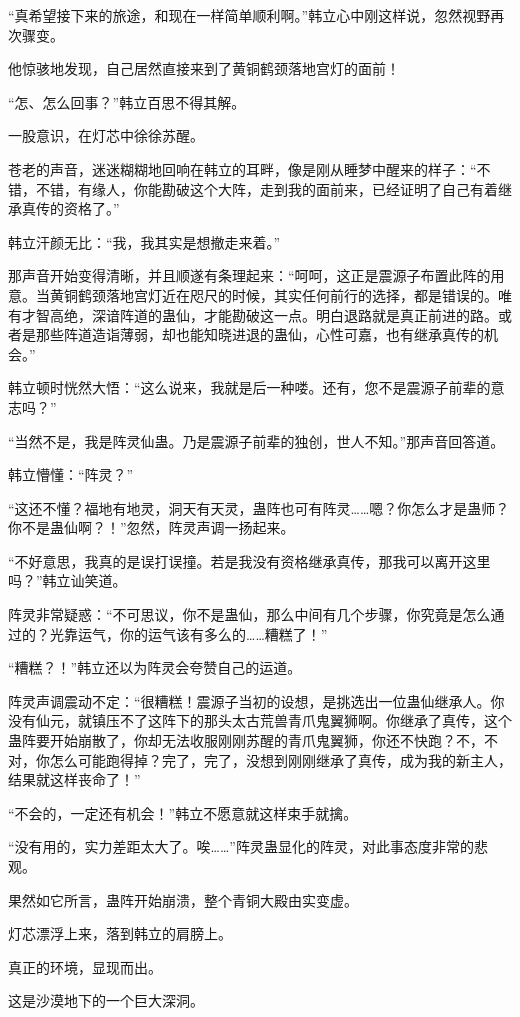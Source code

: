 \begin{this_body}
“真希望接下来的旅途，和现在一样简单顺利啊。”韩立心中刚这样说，忽然视野再次骤变。

他惊骇地发现，自己居然直接来到了黄铜鹤颈落地宫灯的面前！

“怎、怎么回事？”韩立百思不得其解。

一股意识，在灯芯中徐徐苏醒。

苍老的声音，迷迷糊糊地回响在韩立的耳畔，像是刚从睡梦中醒来的样子：“不错，不错，有缘人，你能勘破这个大阵，走到我的面前来，已经证明了自己有着继承真传的资格了。”

韩立汗颜无比：“我，我其实是想撤走来着。”

那声音开始变得清晰，并且顺遂有条理起来：“呵呵，这正是震源子布置此阵的用意。当黄铜鹤颈落地宫灯近在咫尺的时候，其实任何前行的选择，都是错误的。唯有才智高绝，深谙阵道的蛊仙，才能勘破这一点。明白退路就是真正前进的路。或者是那些阵道造诣薄弱，却也能知晓进退的蛊仙，心性可嘉，也有继承真传的机会。”

韩立顿时恍然大悟：“这么说来，我就是后一种喽。还有，您不是震源子前辈的意志吗？”

“当然不是，我是阵灵仙蛊。乃是震源子前辈的独创，世人不知。”那声音回答道。

韩立懵懂：“阵灵？”

“这还不懂？福地有地灵，洞天有天灵，蛊阵也可有阵灵……嗯？你怎么才是蛊师？你不是蛊仙啊？！”忽然，阵灵声调一扬起来。

“不好意思，我真的是误打误撞。若是我没有资格继承真传，那我可以离开这里吗？”韩立讪笑道。

阵灵非常疑惑：“不可思议，你不是蛊仙，那么中间有几个步骤，你究竟是怎么通过的？光靠运气，你的运气该有多么的……糟糕了！”

“糟糕？！”韩立还以为阵灵会夸赞自己的运道。

阵灵声调震动不定：“很糟糕！震源子当初的设想，是挑选出一位蛊仙继承人。你没有仙元，就镇压不了这阵下的那头太古荒兽青爪鬼翼狮啊。你继承了真传，这个蛊阵要开始崩散了，你却无法收服刚刚苏醒的青爪鬼翼狮，你还不快跑？不，不对，你怎么可能跑得掉？完了，完了，没想到刚刚继承了真传，成为我的新主人，结果就这样丧命了！”

“不会的，一定还有机会！”韩立不愿意就这样束手就擒。

“没有用的，实力差距太大了。唉……”阵灵蛊显化的阵灵，对此事态度非常的悲观。

果然如它所言，蛊阵开始崩溃，整个青铜大殿由实变虚。

灯芯漂浮上来，落到韩立的肩膀上。

真正的环境，显现而出。

这是沙漠地下的一个巨大深洞。


\end{this_body}

